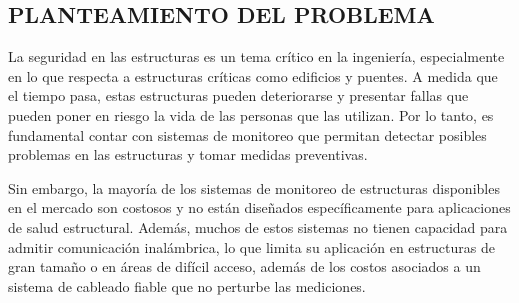 \documentclass[12pt,letterpaper]{article}
\begin{document}
\newpage



\begin{center}
	\section*{ PLANTEAMIENTO DEL PROBLEMA}
\end{center}


\vspace{0.3cm}

La seguridad en las estructuras es un tema crítico en la ingeniería, especialmente en lo que respecta a estructuras críticas como edificios y puentes. A medida que el tiempo pasa, estas estructuras pueden deteriorarse y presentar fallas que pueden poner en riesgo la vida de las personas que las utilizan. Por lo tanto, es fundamental contar con sistemas de monitoreo que permitan detectar posibles problemas en las estructuras y tomar medidas preventivas.

Sin embargo, la mayoría de los sistemas de monitoreo de estructuras disponibles en el mercado son costosos y no están diseñados específicamente para aplicaciones de salud estructural. Además, muchos de estos sistemas no tienen capacidad para admitir comunicación inalámbrica, lo que limita su aplicación en estructuras de gran tamaño o en áreas de difícil acceso, además de los costos asociados a un sistema de cableado fiable que no perturbe las mediciones.




\end{document}
